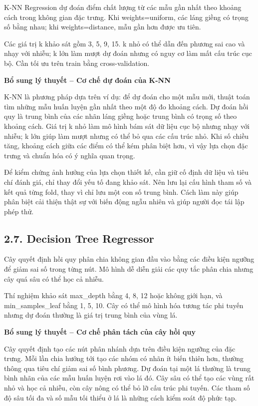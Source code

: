 \documentclass[12pt,a4paper,oneside]{article}
\begin{document}
K-NN Regression dự đoán điểm chất lượng từ các mẫu gần nhất theo khoảng
cách trong không gian đặc trưng. Khi weights=uniform, các láng giềng có
trọng số bằng nhau; khi weights=distance, mẫu gần hơn được ưu tiên.

Các giá trị k khảo sát gồm 3, 5, 9, 15. k nhỏ có thể dẫn đến phương sai
cao và nhạy với nhiễu; k lớn làm mượt dự đoán nhưng có nguy cơ làm mất
cấu trúc cục bộ. Cần tối ưu trên train bằng cross-validation.


\par\noindent\textbf{Bổ sung lý thuyết -- Cơ chế dự đoán của K-NN}\par
K-NN là phương pháp dựa trên ví dụ: để dự đoán cho một mẫu mới, thuật toán tìm những mẫu huấn luyện gần nhất theo một độ đo khoảng cách. Dự đoán hồi quy là trung bình của các nhãn láng giềng hoặc trung bình có trọng số theo khoảng cách. Giá trị k nhỏ làm mô hình bám sát dữ liệu cục bộ nhưng nhạy với nhiễu; k lớn giúp làm mượt nhưng có thể bỏ qua các cấu trúc nhỏ. Khi số chiều tăng, khoảng cách giữa các điểm có thể kém phân biệt hơn, vì vậy lựa chọn đặc trưng và chuẩn hóa có ý nghĩa quan trọng.\par

Để kiểm chứng ảnh hưởng của lựa chọn thiết kế, cần giữ cố định dữ liệu và tiêu chí đánh giá, chỉ thay đổi yếu tố đang khảo sát. Nên lưu lại cấu hình tham số và kết quả từng fold, thay vì chỉ lưu một con số trung bình. Cách làm này giúp phân biệt cải thiện thật sự với biến động ngẫu nhiên và giúp người đọc tái lập phép thử.\par

\subsection*{2.7. Decision Tree Regressor}

Cây quyết định hồi quy phân chia không gian đầu vào bằng các điều kiện
ngưỡng để giảm sai số trong từng nút. Mô hình dễ diễn giải các quy tắc
phân chia nhưng cây quá sâu có thể học cả nhiễu.

Thí nghiệm khảo sát max\_depth bằng 4, 8, 12 hoặc không giới hạn, và
min\_samples\_leaf bằng 1, 5, 10. Cây có thể mô hình hóa tương tác phi
tuyến nhưng dự đoán thường là giá trị trung bình của vùng lá.


\par\noindent\textbf{Bổ sung lý thuyết -- Cơ chế phân tách của cây hồi quy}\par
Cây quyết định tạo các nút phân nhánh dựa trên điều kiện ngưỡng của đặc trưng. Mỗi lần chia hướng tới tạo các nhóm có nhãn ít biến thiên hơn, thường thông qua tiêu chí giảm sai số bình phương. Dự đoán tại một lá thường là trung bình nhãn của các mẫu huấn luyện rơi vào lá đó. Cây sâu có thể tạo các vùng rất nhỏ và học cả nhiễu, còn cây nông có thể bỏ lỡ cấu trúc phi tuyến. Các tham số độ sâu tối đa và số mẫu tối thiểu ở lá là những cách kiểm soát độ phức tạp.\par
\end{document}
